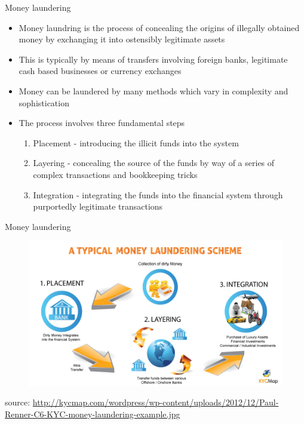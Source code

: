 \documentclass[11pt]{beamer}
\begin{document}
\begin{frame}{Money laundering}
	\begin{itemize}
		\item Money laundring is the process of concealing the origins of illegally obtained money by exchanging it into ostensibly legitimate assets
		\item This is typically by means of transfers involving foreign banks, legitimate cash based businesses or currency exchanges
		\item Money can be laundered by many methods which vary in complexity and sophistication
		\item The process involves three fundamental steps
		\begin{enumerate}
			\item Placement - introducing the illicit funds into the system
			\item Layering - concealing the source of the funds by way of a series of complex transactions and bookkeeping tricks
			\item Integration - integrating the funds into the financial system through purportedly legitimate transactions
		\end{enumerate}
	\end{itemize}
\end{frame}


\begin{frame}{Money laundering}
	\begin{figure}[]
		\centering
		\includegraphics  [width=4.in]{Images/kyc}
	\end{figure}
	\begin{scriptsize}
		source: \href{http://kycmap.com/what-is-money-laundering/}{http://kycmap.com/wordpress/wp-content/uploads/2012/12/Paul-Renner-C6-KYC-money-laundering-example.jpg}
	\end{scriptsize}
\end{frame}
\end{document}
